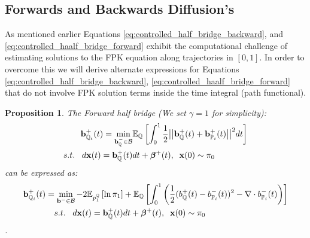 \documentclass[a4paper,12pt,twoside,openright]{report}
\newtheorem{proposition}[theorem]{Proposition}
\theoremstyle{definition}
\begin{document}
\subsection{Forwards and Backwards Diffusion's}

As mentioned earlier Equations \ref{eq:controlled_half_bridge_backward}, and \ref{eq:controlled_haalf_bridge_forward} exhibit the computational challenge of estimating solutions to the FPK equation along trajectories in $[0,1]$.  In order to overcome this we will derive alternate expressions for Equations \ref{eq:controlled_half_bridge_backward},  \ref{eq:controlled_haalf_bridge_forward} that do not involve FPK solution terms inside the time integral (path functional).
\begin{proposition}\label{prop:halfforcontrol}
The Forward half bridge (We set $\gamma=1$  for simplicity):
\begin{align*} 
   {\mathbf{b}}^{+}_{{\mathbb{Q}}_{i}}(t) =\min_{{\mathbf{b}}_{\mathbb{Q}}^{-} \in {\mathcal{B}} } & \mathbb{E}_{\mathbb{Q}}\left[\int_0^1 \frac{1}{2}\big|\big|{\mathbf{b}}_{\mathbb{Q}}^{+}(t) +{\mathbf{b}}^{+}_{{\mathbb{P}}_{i}}(t)\big|\big|^2 dt\right] \nonumber \\
    s.t.\;\;\; d{\mathbf{x}}(t) = {\mathbf{b}}_{\mathbb{Q}}^{+}(t) &dt +  {\bm{\beta}}^{+}(t), \;\; {\mathbf{x}}(0) \sim \pi_0
\end{align*}
can be expressed as:
\begin{align} \label{eq:div_control_forward}
   {\mathbf{b}}^{+}_{{\mathbb{Q}}_{i}}(t) =\min_{{\mathbf{b}}^{-} \in {\mathcal{B}} } -2\mathbb{E}_{p^{{\mathbb{Q}}}_1}\left[\operatorname{ln} \pi_1 \right] &+ \mathbb{E}_{{\mathbb{Q}}}\left[\int_0^1 \left(\frac{1}{2}(b_{\mathbb{Q}}^{+}(t) - b_{{\mathbb{P}}_{i}}^{-}(t))^2 - \nabla\cdot b^{-}_{{\mathbb{P}}_{i}}(t) \right)\right] \nonumber \\
    s.t.\;\;\; d{\mathbf{x}}(t) = {\mathbf{b}}_{\mathbb{Q}}^{+}(t) &dt + {\bm{\beta}}^{+}(t), \;\; {\mathbf{x}}(0) \sim \pi_0
\end{align}.
\end{proposition}
\end{document}

